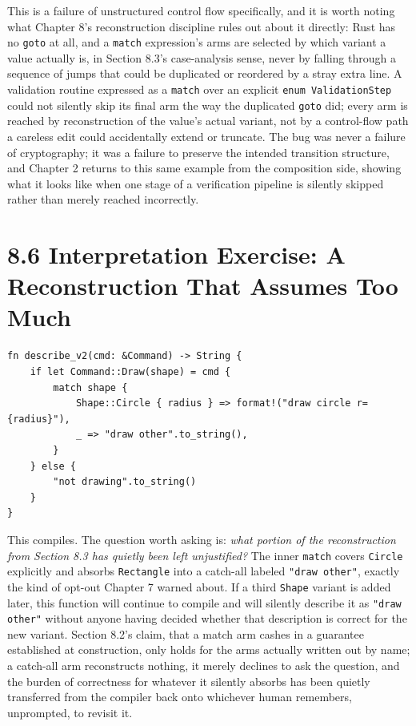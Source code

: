\documentclass[11pt]{book}
\begin{document}
This is a failure of unstructured control flow specifically, and it is worth noting what Chapter 8's reconstruction discipline rules out about it directly: Rust has no \texttt{goto} at all, and a \texttt{match} expression's arms are selected by which variant a value actually is, in Section 8.3's case-analysis sense, never by falling through a sequence of jumps that could be duplicated or reordered by a stray extra line. A validation routine expressed as a \texttt{match} over an explicit \texttt{enum ValidationStep} could not silently skip its final arm the way the duplicated \texttt{goto} did; every arm is reached by reconstruction of the value's actual variant, not by a control-flow path a careless edit could accidentally extend or truncate. The bug was never a failure of cryptography; it was a failure to preserve the intended transition structure, and Chapter 2 returns to this same example from the composition side, showing what it looks like when one stage of a verification pipeline is silently skipped rather than merely reached incorrectly.

\section*{8.6 Interpretation Exercise: A Reconstruction That Assumes Too Much}

\begin{lstlisting}
fn describe_v2(cmd: &Command) -> String {
    if let Command::Draw(shape) = cmd {
        match shape {
            Shape::Circle { radius } => format!("draw circle r={radius}"),
            _ => "draw other".to_string(),
        }
    } else {
        "not drawing".to_string()
    }
}
\end{lstlisting}

This compiles. The question worth asking is: \emph{what portion of the reconstruction from Section 8.3 has quietly been left unjustified?} The inner \texttt{match} covers \texttt{Circle} explicitly and absorbs \texttt{Rectangle} into a catch-all labeled \texttt{"draw other"}, exactly the kind of opt-out Chapter 7 warned about. If a third \texttt{Shape} variant is added later, this function will continue to compile and will silently describe it as \texttt{"draw other"} without anyone having decided whether that description is correct for the new variant. Section 8.2's claim, that a match arm cashes in a guarantee established at construction, only holds for the arms actually written out by name; a catch-all arm reconstructs nothing, it merely declines to ask the question, and the burden of correctness for whatever it silently absorbs has been quietly transferred from the compiler back onto whichever human remembers, unprompted, to revisit it.
\end{document}
